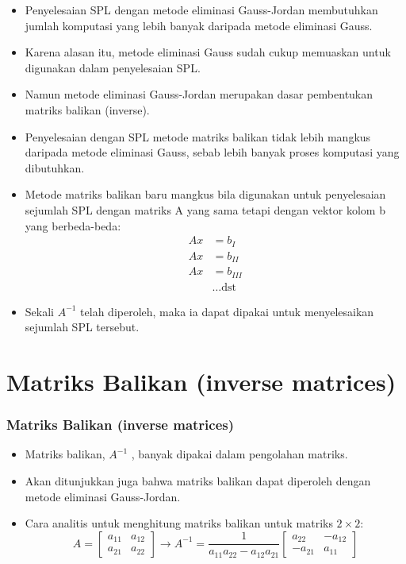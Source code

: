 \documentclass[pdflatex,compress,mathserif]{beamer}
\begin{document}
\begin{frame}
	\begin{itemize}
		\item Penyelesaian SPL dengan metode eliminasi Gauss-Jordan membutuhkan jumlah komputasi yang lebih banyak daripada metode eliminasi Gauss.
		\item Karena alasan itu, metode eliminasi Gauss sudah cukup memuaskan untuk digunakan dalam penyelesaian SPL.
		\item Namun metode eliminasi Gauss-Jordan merupakan dasar pembentukan matriks balikan (inverse).
	\end{itemize}
\end{frame}

\begin{frame}
	\begin{itemize}
		\item Penyelesaian dengan SPL metode matriks balikan tidak lebih mangkus daripada metode eliminasi Gauss, sebab lebih banyak proses komputasi yang dibutuhkan.
		\item Metode matriks balikan baru mangkus bila digunakan untuk penyelesaian sejumlah SPL dengan matriks A yang sama tetapi dengan vektor kolom b yang berbeda-beda:
		\begin{align*}
			Ax &= b_I \\
			Ax &= b_{II} \\
			Ax &= b_{III} \\
			&\dots \text{dst}
		\end{align*}
		\item Sekali $ A^{-1} $ telah diperoleh, maka ia dapat dipakai untuk
		menyelesaikan sejumlah SPL tersebut.
	\end{itemize}
\end{frame}

\section{Matriks Balikan (inverse matrices)}

\begin{frame}
	\frametitle{Matriks Balikan (inverse matrices)}
	\begin{itemize}
		\item Matriks balikan, $ A^{-1} $ , banyak dipakai dalam pengolahan
		matriks.
		\item Akan ditunjukkan juga bahwa matriks balikan dapat diperoleh dengan metode eliminasi Gauss-Jordan.
		\item Cara analitis untuk menghitung matriks balikan untuk matriks $2 \times 2$:
		\[
		A = 
		\begin{bmatrix}
			a_{11} & a_{12} \\ a_{21} & a_{22}
		\end{bmatrix}
		\rightarrow A^{-1} = \frac{1}{a_{11}a_{22} - a_{12}a_{21}}
		\begin{bmatrix}
			a_{22} & -a_{12} \\ -a_{21} & a_{11}
		\end{bmatrix}
		\]
	\end{itemize}
\end{frame}
\end{document}
